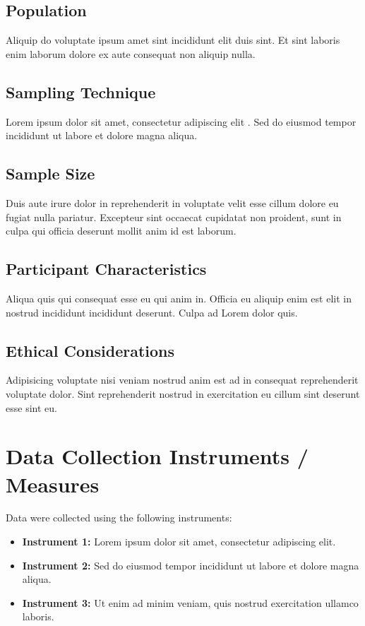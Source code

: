 \subsection{Population}
Aliquip do voluptate ipsum amet sint incididunt elit duis sint. Et sint laboris enim laborum dolore ex aute consequat non aliquip nulla.

\subsection{Sampling Technique}
Lorem ipsum dolor sit amet, consectetur adipiscing elit \parencite{placeholderArticle2023}. Sed do eiusmod tempor incididunt ut labore et dolore magna aliqua.

\subsection{Sample Size}
Duis aute irure dolor in reprehenderit in voluptate velit esse cillum dolore eu fugiat nulla pariatur. Excepteur sint occaecat cupidatat non proident, sunt in culpa qui officia deserunt mollit anim id est laborum.

\subsection{Participant Characteristics}
Aliqua quis qui consequat esse eu qui anim in. Officia eu aliquip enim est elit in nostrud incididunt incididunt deserunt. Culpa ad Lorem dolor quis.

\subsection{Ethical Considerations}
Adipisicing voluptate nisi veniam nostrud anim est ad in consequat reprehenderit voluptate dolor. Sint reprehenderit nostrud in exercitation eu cillum sint deserunt esse sint eu.

\section{Data Collection Instruments / Measures}

Data were collected using the following instruments:
\begin{itemize}
  \item \textbf{Instrument 1:} Lorem ipsum dolor sit amet, consectetur adipiscing elit.
  \item \textbf{Instrument 2:} Sed do eiusmod tempor incididunt ut labore et dolore magna aliqua.
  \item \textbf{Instrument 3:} Ut enim ad minim veniam, quis nostrud exercitation ullamco laboris.
\end{itemize}

